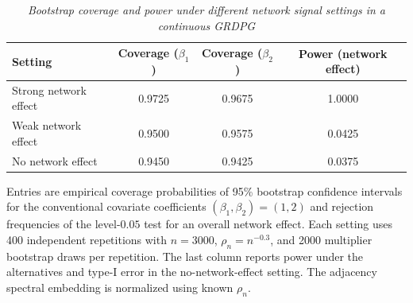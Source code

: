 \begin{table}[htbp]
\centering
\small
\caption{\textit{Bootstrap coverage and power under different network signal settings in a continuous GRDPG}}
\label{tab:strict-grdpg-dense}
\renewcommand{\arraystretch}{1.2}
\begin{tabular}{lccc}
\toprule
Setting & Coverage ($\beta_1$) & Coverage ($\beta_2$) & Power (network effect) \\
\midrule
Strong network effect & 0.9725 & 0.9675 & 1.0000 \\
Weak network effect & 0.9500 & 0.9575 & 0.0425 \\
No network effect & 0.9450 & 0.9425 & 0.0375 \\
\bottomrule
\end{tabular}
\par\smallskip
\begin{minipage}{0.98\linewidth}\footnotesize
Entries are empirical coverage probabilities of 95\% bootstrap confidence intervals for the conventional covariate coefficients $(\beta_1,\beta_2)=(1,2)$ and rejection frequencies of the level-$0.05$ test for an overall network effect. Each setting uses 400 independent repetitions with $n=3000$, $\rho_n=n^{-0.3}$, and 2000 multiplier bootstrap draws per repetition. The last column reports power under the alternatives and type-I error in the no-network-effect setting. The adjacency spectral embedding is normalized using known $\rho_n$.
\end{minipage}
\end{table}
